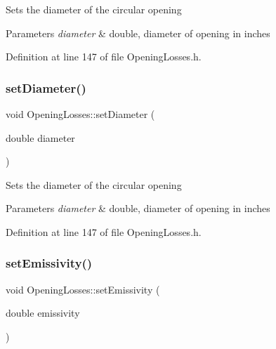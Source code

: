 Sets the diameter of the circular opening 
\begin{DoxyParams}{Parameters}
{\em diameter} & double, diameter of opening in inches \\
\hline
\end{DoxyParams}


Definition at line 147 of file Opening\+Losses.\+h.

\mbox{\label{class_opening_losses_ab840ba51788e83c0b1dc9b8c05b1eadb}} 
\subsubsection{\texorpdfstring{set\+Diameter()}{setDiameter()}\hspace{0.1cm}{\footnotesize\ttfamily [3/3]}}
{\footnotesize\ttfamily void Opening\+Losses\+::set\+Diameter (\begin{DoxyParamCaption}\item[{double}]{diameter }\end{DoxyParamCaption})\hspace{0.3cm}{\ttfamily [inline]}}

Sets the diameter of the circular opening 
\begin{DoxyParams}{Parameters}
{\em diameter} & double, diameter of opening in inches \\
\hline
\end{DoxyParams}


Definition at line 147 of file Opening\+Losses.\+h.

\mbox{\label{class_opening_losses_aa63eb1c2ba9057d401f3a7f5dd974afe}} 
\subsubsection{\texorpdfstring{set\+Emissivity()}{setEmissivity()}\hspace{0.1cm}{\footnotesize\ttfamily [1/3]}}
{\footnotesize\ttfamily void Opening\+Losses\+::set\+Emissivity (\begin{DoxyParamCaption}\item[{double}]{emissivity }\end{DoxyParamCaption})\hspace{0.3cm}{\ttfamily [inline]}}

